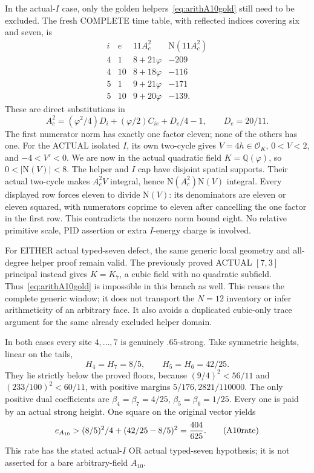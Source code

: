 In the actual-\(I\) case, only the golden
helpers~\eqref{eq:arithA10gold} still need
to be excluded.
The fresh COMPLETE time table, with reflected
indices covering six and seven, is
\[
 \begin{array}{c|c|c|r}
 i&e&11A_c^2&\mathrm N(11A_c^2)\\ \hline
 4&1&8+21\varphi&-209\\
 4&10&8+18\varphi&-116\\
 5&1&9+21\varphi&-171\\
 5&10&9+20\varphi&-139 .
 \end{array}
\]
These are direct substitutions in
\[
 A_c^2=(\varphi^2/4)D_i+(\varphi/2)C_{ie}+D_e/4-1,
                        \qquad D_e=20/11 .
\]
The first numerator norm has exactly one
factor eleven; none of the others has one.
For the ACTUAL isolated \(I\), its own
two-cycle gives \(V=4h\in\mathcal O_K\),
\(0<V<2\), and \(-4<V'<0\).
We are now in the actual quadratic field
\(K=\mathbb Q(\varphi)\), so
\(0<|\mathrm N(V)|<8\).
The helper and \(I\) cap have disjoint
spatial supports.
Their actual two-cycle makes \(A_c^2V\)
integral, hence
\(\mathrm N(A_c^2)\mathrm N(V)\) integral.
Every displayed row forces eleven to divide
\(\mathrm N(V)\): its denominators are
eleven or eleven squared, with numerators
coprime to eleven after cancelling the one
factor in the first row.
This contradicts the nonzero norm bound eight.
No relative primitive scale, PID assertion
or extra \(I\)-energy charge is involved.

For EITHER actual typed-seven defect, the
same generic local geometry and all-degree
helper proof remain valid.
The previously proved ACTUAL \([7,3]\)
principal instead gives \(K=K_7\), a cubic
field with no quadratic subfield.
Thus~\eqref{eq:arithA10gold} is impossible
in this branch as well.
This reuses the complete generic window;
it does not transport the \(N=12\) inventory
or infer arithmeticity of an arbitrary face.
It also avoids a duplicated cubic-only
trace argument for the same already excluded
helper domain.

In both cases every site \(4,\ldots,7\)
is genuinely \(.65\)-strong.
Take symmetric heights, linear on the tails,
\[
                  H_4=H_7=8/5,\qquad H_5=H_6=42/25 .
\]
They lie strictly below the proved floors,
because \((9/4)^2<56/11\) and
\((233/100)^2<60/11\), with positive
margins \(5/176,2821/110000\).
The only positive dual coefficients are
\(\beta_4=\beta_7=4/25\),
\(\beta_5=\beta_6=1/25\).
Every one is paid by an actual strong height.
One square on the original vector yields
\[
                       e_{A_{10}}>
                   (8/5)^2/4+(42/25-8/5)^2
                   ={404\over625}.
\tag{A10rate}\label{eq:arithA10conditionalrate}
\]
This rate has the stated actual-\(I\) OR
actual typed-seven hypothesis; it is not
asserted for a bare arbitrary-field \(A_{10}\).

